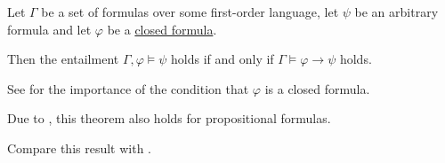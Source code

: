 \begin{theorem}\label{thm:semantic_deduction_theorem}
  Let \( \Gamma \) be a set of formulas over some first-order language, let \( \psi \) be an arbitrary formula and let \( \varphi \) be a \hyperref[def:first_order_syntax/ground_formula]{closed formula}.

  Then the entailment \( \Gamma, \varphi \vDash \psi \) holds if and only if \( \Gamma \vDash \varphi \to \psi \) holds.

  See  for the importance of the condition that \( \varphi \) is a closed formula.

  Due to , this theorem also holds for propositional formulas.

  Compare this result with .
\end{theorem}
